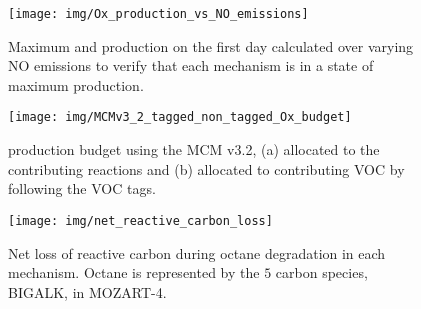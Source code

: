 %
\begin{figure}[!h]
    \begin{center}
        \texttt{[image: img/Ox\_production\_vs\_NO\_emissions]}
        \caption{Maximum  and  production on the first day calculated over varying NO emissions to verify that each mechanism is in a state of maximum  production.}
    \end{center}
\end{figure} 
%
\begin{figure}[!h]
    \begin{center}
        \vspace{-15mm}
        \texttt{[image: img/MCMv3\_2\_tagged\_non\_tagged\_Ox\_budget]}
        \caption{ production budget using the MCM v3.2, (a) allocated to the contributing reactions and (b) allocated to contributing VOC by following the VOC tags.}
    \end{center}
\end{figure} 
%
\begin{figure}[!h]
    \begin{center}
        \texttt{[image: img/net\_reactive\_carbon\_loss]}
        \caption{Net loss of reactive carbon during octane degradation in each mechanism. Octane is represented by the $5$ carbon species, BIGALK, in MOZART-4.}
    \end{center}
\end{figure} 
